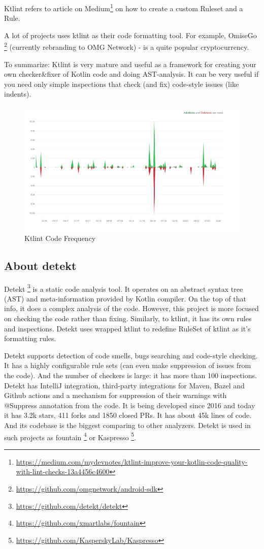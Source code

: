 Ktlint refers to article on Medium\footnote{\url{https://medium.com/mydevnotes/ktlint-improve-your-kotlin-code-quality-with-lint-checks-13a4456c4600}} on how to create a custom Ruleset and a Rule.

A lot of projects uses ktlint as their code formatting tool. For example, OmiseGo \footnote{\url{https://github.com/omgnetwork/android-sdk}} (currently rebranding to OMG Network) - is a quite popular cryptocurrency.

To summarize: Ktlint is very mature and useful as a framework for creating your own checker\&fixer of Kotlin code and doing AST-analysis. It can be very useful if you need only simple inspections that check (and fix) code-style issues (like indents).

\begin{figure}[H]
    \centering
    \includegraphics[scale = 0.6]{pictures/ktlint.png}
    \caption{Ktlint Code Frequency}
    \label{fig:png_ktlint}
\end{figure}

\subsection{About detekt}
Detekt \footnote{\url{https://github.com/detekt/detekt}} is a static code analysis tool. It operates on an abstract syntax tree (AST) and meta-information provided by Kotlin compiler. On the top of that info, it does a complex analysis of the code. However, this project is more focused on checking the code rather than fixing. Similarly, to ktlint, it has its own rules and inspections. Detekt uses wrapped ktlint to redefine RuleSet of ktlint as it’s formatting rules.

Detekt supports detection of code smells, bugs searching and code-style checking. It has a highly configurable rule sets (can even make suppression of issues from the code). And the number of checkers is large: it has more than 100 inspections. Detekt has IntelliJ integration, third-party integrations for Maven, Bazel and Github actions and a mechanism for suppression of their warnings with @Suppress annotation from the code. It is being developed since 2016 and today it has 3.2k stars, 411 forks and 1850 closed PRs. It has about 45k lines of code. And its codebase is the biggest comparing to other analyzers.
Detekt is used in such projects as fountain \footnote{\url{https://github.com/xmartlabs/fountain}} or Kaspresso   \footnote{\url{https://github.com/KasperskyLab/Kaspresso}}.

